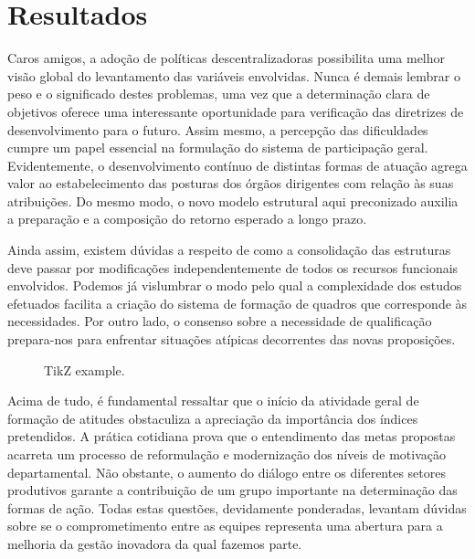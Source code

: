 \chapter{Resultados}

Caros amigos, a adoção de políticas descentralizadoras possibilita uma melhor visão global do levantamento das variáveis envolvidas. Nunca é demais lembrar o peso e o significado destes problemas, uma vez que a determinação clara de objetivos oferece uma interessante oportunidade para verificação das diretrizes de desenvolvimento para o futuro. Assim mesmo, a percepção das dificuldades cumpre um papel essencial na formulação do sistema de participação geral. Evidentemente, o desenvolvimento contínuo de distintas formas de atuação agrega valor ao estabelecimento das posturas dos órgãos dirigentes com relação às suas atribuições. Do mesmo modo, o novo modelo estrutural aqui preconizado auxilia a preparação e a composição do retorno esperado a longo prazo.

Ainda assim, existem dúvidas a respeito de como a consolidação das estruturas deve passar por modificações independentemente de todos os recursos funcionais envolvidos. Podemos já vislumbrar o modo pelo qual a complexidade dos estudos efetuados facilita a criação do sistema de formação de quadros que corresponde às necessidades. Por outro lado, o consenso sobre a necessidade de qualificação prepara-nos para enfrentar situações atípicas decorrentes das novas proposições.


\begin{figure}[htbp]
    \centering
     
    \caption{TikZ example.}
    \label{fig:name}
\end{figure}


Acima de tudo, é fundamental ressaltar que o início da atividade geral de formação de atitudes obstaculiza a apreciação da importância dos índices pretendidos. A prática cotidiana prova que o entendimento das metas propostas acarreta um processo de reformulação e modernização dos níveis de motivação departamental. Não obstante, o aumento do diálogo entre os diferentes setores produtivos garante a contribuição de um grupo importante na determinação das formas de ação. Todas estas questões, devidamente ponderadas, levantam dúvidas sobre se o comprometimento entre as equipes representa uma abertura para a melhoria da gestão inovadora da qual fazemos parte.

